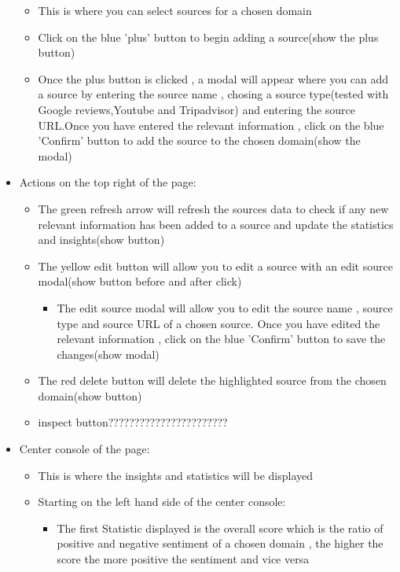\documentclass[12pt]{article}
\begin{document}
\begin{itemize}
    \begin{itemize}
        \item This is where you can select sources for a chosen domain 
        \item Click on the blue 'plus' button to begin adding a source(show the plus button)
        \item Once the plus button is clicked , a modal will appear where you can add a source by entering the source name , chosing a source type(tested with Google reviews,Youtube and Tripadvisor) and entering the source URL.Once you have entered the relevant information , click on the blue 'Confirm' button to add the source to the chosen domain(show the modal)
    \end{itemize}
    \item Actions on the top right of the page:
    \begin{itemize}
        \item The green refresh arrow will refresh the sources data to check if any new relevant information has been added to a source and update the statistics and insights(show button)
        \item The yellow edit button will allow you to edit a source with an edit source modal(show button before and after click)
        \begin{itemize}
            \item The edit source modal will allow you to edit the source name , source type and source URL of a chosen source. Once you have edited the relevant information , click on the blue 'Confirm' button to save the changes(show modal)
        \end{itemize}
        \item The red delete button will delete the highlighted source from the chosen domain(show button)
        \item inspect button???????????????????????
    \end{itemize}
    \item Center console of the page:
    \begin{itemize}
        \item This is where the insights and statistics will be displayed
        \item Starting on the left hand side of the center console:
        \begin{itemize}
            \item The first Statistic displayed is the overall score which is the ratio of positive and negative sentiment of a chosen domain , the higher the score the more positive the sentiment and vice versa

\end{itemize}
\end{itemize}
\end{itemize}
\end{document}
